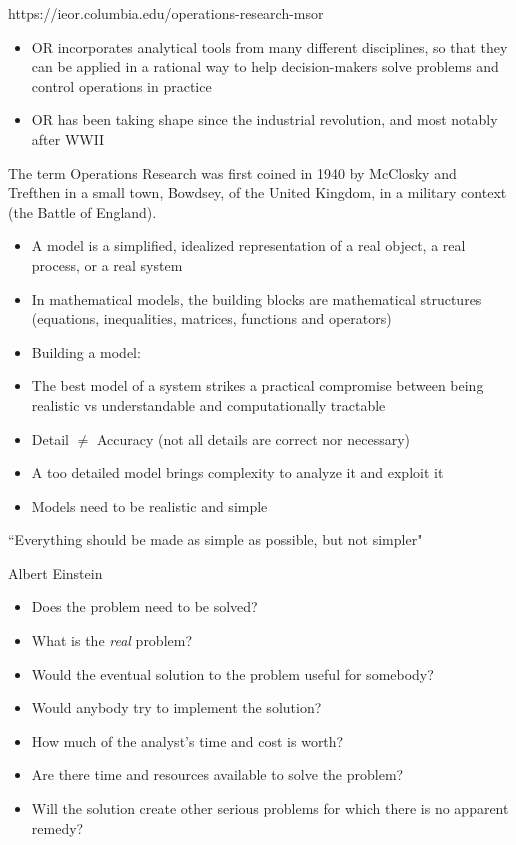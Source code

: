 https://ieor.columbia.edu/operations-research-msor

\begin{itemize}
  \item OR incorporates analytical tools from many different disciplines, so that they can be applied in a rational way to help decision-makers solve problems and control operations in practice
  \item OR has been taking shape since the industrial revolution, and most notably after WWII
\end{itemize}
The term Operations Research was first coined in 1940 by McClosky and Trefthen
in a small town, Bowdsey, of the United Kingdom, in a military context (the Battle of England).



  \begin{itemize}
    \item A model is a simplified, idealized representation of a real object, a real process, or a real system
    \item In mathematical models, the building blocks are mathematical structures (equations, inequalities, matrices, functions and operators)
    \item Building a model:
          
  \end{itemize}



  \begin{itemize}
    \item The best model of a system strikes a practical compromise between being realistic vs understandable and computationally tractable
    \item Detail $\neq$ Accuracy (not all details are correct nor necessary)
    \item A too detailed model brings complexity to analyze it and exploit it
    \item Models need to be realistic and simple
  \end{itemize}
  \epigraph{``Everything should be made as simple as possible, but not simpler"}{Albert Einstein}




  \begin{itemize}
    \item Does the problem need to be solved?
    \item What is the {\it real} problem?
    \item Would the eventual solution to the problem useful for somebody?
    \item Would anybody try to implement the solution?
    \item How much of the analyst's time and cost is worth?
    \item Are there time and resources available to solve the problem?
    \item Will the solution create other serious problems for which there is no apparent remedy?
  \end{itemize}


